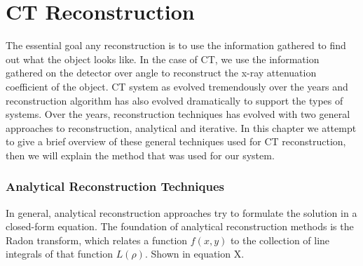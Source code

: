 \chapter{CT Reconstruction}
The essential goal any reconstruction is to use the information gathered to find out what the object looks like.  In the case of CT, we use the information gathered on the detector over angle to reconstruct the x-ray attenuation coefficient of the object.  CT system as evolved tremendously over the years and reconstruction algorithm has also evolved dramatically to support the types of systems. Over the years, reconstruction techniques has evolved with two general approaches to reconstruction, analytical and iterative.  In this chapter we attempt to give a brief overview of these general techniques used for CT reconstruction, then we will explain the method that was used for our system.

\subsection{Analytical Reconstruction Techniques}
In general, analytical reconstruction approaches try to formulate the solution in a closed-form equation.  The foundation of analytical reconstruction methods is the Radon transform, which relates a function $f(x,y)$ to the collection of line integrals of that function $L(\rho)$.  Shown in equation X. 

\begin{equation}
\label{eq:radon}
\end{equation}

